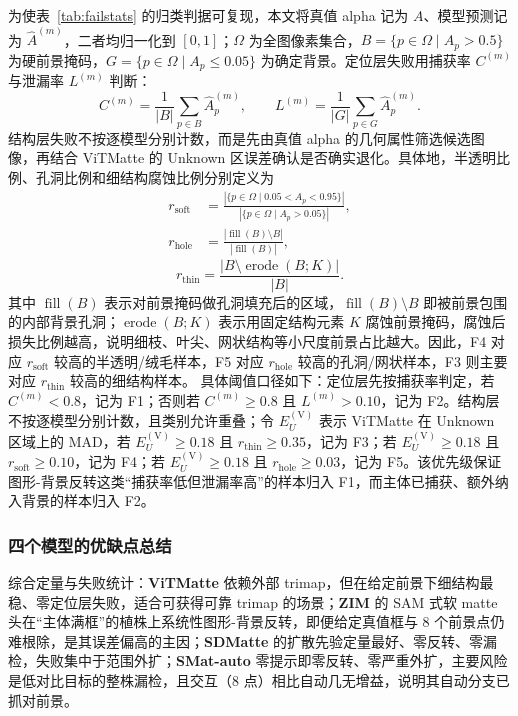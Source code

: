 \documentclass[supercite]{HustGraduPaper}
\begin{document}
	为使表~\ref{tab:failstats} 的归类判据可复现，本文将真值 alpha 记为 $A$、模型预测记为 $\hat{A}^{(m)}$，二者均归一化到 $[0,1]$；$\Omega$ 为全图像素集合，$B=\{p\in\Omega\mid A_p>0.5\}$ 为硬前景掩码，$G=\{p\in\Omega\mid A_p\leq0.05\}$ 为确定背景。定位层失败用捕获率 $C^{(m)}$ 与泄漏率 $L^{(m)}$ 判断：
	\begin{equation}
		C^{(m)}=\frac{1}{|B|}\sum_{p\in B}\hat{A}^{(m)}_p,\qquad
		L^{(m)}=\frac{1}{|G|}\sum_{p\in G}\hat{A}^{(m)}_p .
	\end{equation}
	结构层失败不按逐模型分别计数，而是先由真值 alpha 的几何属性筛选候选图像，再结合 ViTMatte 的 Unknown 区误差确认是否确实退化。具体地，半透明比例、孔洞比例和细结构腐蚀比例分别定义为
	\begin{equation}
		\begin{aligned}
			r_{\mathrm{soft}}&=\frac{|\{p\in\Omega\mid 0.05<A_p<0.95\}|}{|\{p\in\Omega\mid A_p>0.05\}|},\\
			r_{\mathrm{hole}}&=\frac{|\operatorname{fill}(B)\setminus B|}{|\operatorname{fill}(B)|},
		\end{aligned}
	\end{equation}
	\begin{equation}
		r_{\mathrm{thin}}=\frac{|B\setminus\operatorname{erode}(B;K)|}{|B|}.
	\end{equation}
	其中 $\operatorname{fill}(B)$ 表示对前景掩码做孔洞填充后的区域，$\operatorname{fill}(B)\setminus B$ 即被前景包围的内部背景孔洞；$\operatorname{erode}(B;K)$ 表示用固定结构元素 $K$ 腐蚀前景掩码，腐蚀后损失比例越高，说明细枝、叶尖、网状结构等小尺度前景占比越大。因此，F4 对应 $r_{\mathrm{soft}}$ 较高的半透明/绒毛样本，F5 对应 $r_{\mathrm{hole}}$ 较高的孔洞/网状样本，F3 则主要对应 $r_{\mathrm{thin}}$ 较高的细结构样本。
	具体阈值口径如下：定位层先按捕获率判定，若 $C^{(m)}<0.8$，记为 F1；否则若 $C^{(m)}\geq0.8$ 且 $L^{(m)}>0.10$，记为 F2。结构层不按逐模型分别计数，且类别允许重叠；令 $E_U^{(\mathrm{V})}$ 表示 ViTMatte 在 Unknown 区域上的 MAD，若 $E_U^{(\mathrm{V})}\geq0.18$ 且 $r_{\mathrm{thin}}\geq0.35$，记为 F3；若 $E_U^{(\mathrm{V})}\geq0.18$ 且 $r_{\mathrm{soft}}\geq0.10$，记为 F4；若 $E_U^{(\mathrm{V})}\geq0.18$ 且 $r_{\mathrm{hole}}\geq0.03$，记为 F5。该优先级保证图形-背景反转这类“捕获率低但泄漏率高”的样本归入 F1，而主体已捕获、额外纳入背景的样本归入 F2。

	


	\subsubsection{四个模型的优缺点总结}
	综合定量与失败统计：\textbf{ViTMatte} 依赖外部 trimap，但在给定前景下细结构最稳、零定位层失败，适合可获得可靠 trimap 的场景；\textbf{ZIM} 的 SAM 式软 matte 头在“主体满框”的植株上系统性图形-背景反转，即便给定真值框与 8 个前景点仍难根除，是其误差偏高的主因；\textbf{SDMatte} 的扩散先验定量最好、零反转、零漏检，失败集中于范围外扩；\textbf{SMat-auto} 零提示即零反转、零严重外扩，主要风险是低对比目标的整株漏检，且交互（8 点）相比自动几无增益，说明其自动分支已抓对前景。
\end{document}
